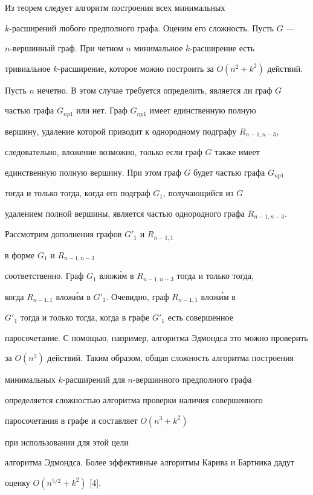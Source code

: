 \begin{notenonum}


Из теорем следует алгоритм построения всех минимальных


$k$-расширений любого предполного графа. Оценим его сложность. Пусть $G$ ---


$n$-вершинный граф. При четном $n$ минимальное $k$-расширение есть


тривиальное $k$-расширение, которое можно построить за $O(n^2+k^2)$ действий.


Пусть $n$ нечетно. В этом случае требуется определить, является ли граф $G$


частью графа $G_{np1}$ или нет. Граф $G_{np1}$ имеет единственную полную


вершину, удаление которой приводит к однородному подграфу $R_{n-1,n-3}$,


следовательно, вложение возможно, только если граф $G$ также имеет


единственную полную вершину. При этом граф $G$ будет частью графа $G_{np1}$


тогда и только тогда, когда его подграф $G_1$, получающийся из $G$


удалением полной вершины, является частью однородного графа $R_{n-1, n-3}$.


Рассмотрим дополнения графов $G'_1$ и $R_{n-1,1}$


в форме $G_1$ и $R_{n-1,n-3}$


соответственно. Граф $G_1$ влож\'им в $R_{n-1,n-3}$ тогда и только тогда,


когда $R_{n-1,1}$ влож\'им в $G'_1$. Очевидно, граф $R_{n-1,1}$ влож\'им в


$G'_1$ тогда и только тогда, когда в графе $G'_1$ есть совершенное


паросочетание. С помощью, например, алгоритма Эдмондса это можно проверить


за $O(n^3)$ действий. Таким образом, общая сложность алгоритма построения


минимальных $k$-расширений для $n$-вершинного предполного графа


определяется сложностью алгоритма проверки наличия совершенного


паросочетания в графе и составляет $O(n^3+k^2)$


при использовании для этой цели


алгоритма Эдмондса. Более эффективные алгоритмы Карива и Бартника дадут


оценку $O(n^{5/2}+k^2)$ [4].


\end{notenonum}






